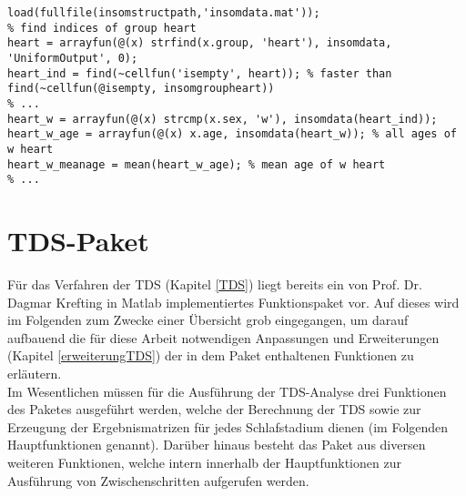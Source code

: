 \begin{lstlisting}[caption={Implementierung Kriterium D5 in Skript ma\_extract\_goup\_information.m}, label={lst:D5}]
% ...
load(fullfile(insomstructpath,'insomdata.mat'));
% find indices of group heart
heart = arrayfun(@(x) strfind(x.group, 'heart'), insomdata, 'UniformOutput', 0);
heart_ind = find(~cellfun('isempty', heart)); % faster than find(~cellfun(@isempty, insomgroupheart))
% ...
heart_w = arrayfun(@(x) strcmp(x.sex, 'w'), insomdata(heart_ind));
heart_w_age = arrayfun(@(x) x.age, insomdata(heart_w)); % all ages of w heart
heart_w_meanage = mean(heart_w_age); % mean age of w heart
% ...
\end{lstlisting}

\section{TDS-Paket}\label{tdsPaket}

Für das Verfahren der TDS (Kapitel \ref{TDS}) liegt bereits ein von Prof. Dr. Dagmar Krefting in Matlab implementiertes Funktionspaket vor. Auf dieses wird im Folgenden zum Zwecke einer Übersicht grob eingegangen, um darauf aufbauend die für diese Arbeit notwendigen Anpassungen und Erweiterungen (Kapitel \ref{erweiterungTDS}) der in dem Paket enthaltenen Funktionen zu erläutern.\\

Im Wesentlichen müssen für die Ausführung der \acs{TDS}-Analyse drei Funktionen des Paketes ausgeführt werden, welche der Berechnung der \acs{TDS} sowie zur Erzeugung der Ergebnismatrizen für jedes Schlafstadium dienen (im Folgenden Hauptfunktionen genannt). Darüber hinaus besteht das Paket aus diversen weiteren Funktionen, welche intern innerhalb der Hauptfunktionen zur Ausführung von Zwischenschritten aufgerufen werden.\\

